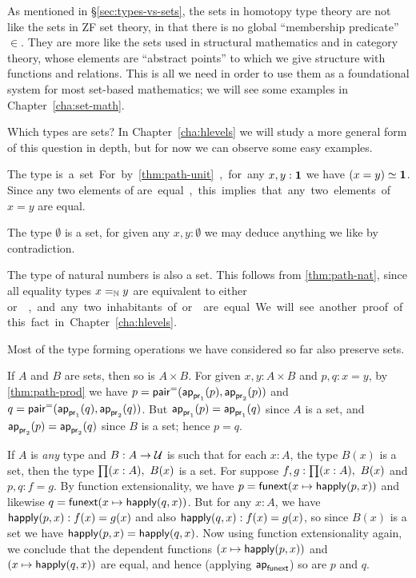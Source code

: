 As mentioned in \S\ref{sec:types-vs-sets},
the sets in homotopy type theory are not like the sets in ZF set theory, in that there is no global ``membership predicate'' $\in$.
They are more like the sets used in structural mathematics and in category theory, whose elements are ``abstract points'' to which we give structure with functions and relations.
This is all we need in order to use them as a foundational system for most set-based mathematics; we will see some examples in Chapter~\ref{cha:set-math}.

Which types are sets?
In Chapter~\ref{cha:hlevels} we will study a more general form of this question in depth, but for now we can observe some easy examples.

\begin{eg}
  The type \unit is a set.
  For by \autoref{thm:path-unit}, for any $x,y:\unit$ we have $\eqv{(x=y)}{\unit}$.
  Since any two elements of \unit are equal, this implies that any two elements of $x=y$ are equal.
\end{eg}

\begin{eg}
  The type $\emptyset$ is a set, for given any $x,y:\emptyset$ we may deduce anything we like by contradiction.
\end{eg}

\begin{eg}
  The type \nat of natural numbers is also a set.
  This follows from \autoref{thm:path-nat}, since all equality types $\id[\nat]xy$ are equivalent to either \unit or \emptyt, and any two inhabitants of \unit or \emptyt are equal.
  We will see another proof of this fact in Chapter~\ref{cha:hlevels}.
\end{eg}

Most of the type forming operations we have considered so far also preserve sets.

\begin{eg}\label{thm:isset-prod}
  If $A$ and $B$ are sets, then so is $A\times B$.
  For given $x,y:A\times B$ and $p,q:x=y$, by \autoref{thm:path-prod} we have $p= \pairpath(\projpath1(p),\projpath2(p))$ and $q= \pairpath(\projpath1(q),\projpath2(q))$.
  But $\projpath1(p)=\projpath1(q)$ since $A$ is a set, and $\projpath2(p)=\projpath2(q)$ since $B$ is a set; hence $p=q$.
\end{eg}

\begin{eg}\label{thm:isset-forall}
  If $A$ is \emph{any} type and $B:A\to \type$ is such that for each $x:A$, the type $B(x)$ is a set, then the type $\prd{x:A} B(x)$ is a set.
  For suppose $f,g:\prd{x:A} B(x)$ and $p,q:f=g$.
  By function extensionality, we have $p = {\funext (x \mapsto \happly(p,x))}$ and likewise $q = {\funext (x \mapsto \happly(q,x))}$.
  But for any $x:A$, we have $\happly(p,x):f(x)=g(x)$ and also $\happly(q,x):f(x)=g(x)$, so since $B(x)$ is a set we have $\happly(p,x) = \happly(q,x)$.
  Now using function extensionality again, we conclude that the dependent functions $(x \mapsto \happly(p,x))$ and $(x \mapsto \happly(q,x))$ are equal, and hence (applying $\apfunc{\funext}$) so are $p$ and $q$.
\end{eg}

